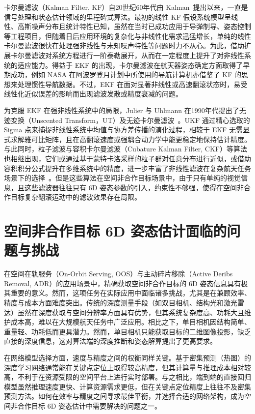 卡尔曼滤波（Kalman Filter, KF）自20世纪60年代由 Kalman~\cite{kalman1960new}提出以来，一直是信号处理和状态估计领域的里程碑式算法。最初的线性 KF 假设系统模型呈线性、高斯噪声分布且统计特性已知，虽然在当时已成功应用于导弹制导、姿态控制等工程项目，但随着日后应用环境的复杂化与非线性化需求迅猛增长，单纯的线性卡尔曼滤波很快在处理强非线性与未知噪声特性等问题时力不从心。为此，借助扩展卡尔曼滤波对系统方程进行一阶泰勒展开，从而在一定程度上提升了对非线性系统的适应能力。得益于 EKF 的出现，卡尔曼滤波在航天器姿态确定方面取得了早期成功，例如 NASA 在阿波罗登月计划中所使用的导航计算机亦借鉴了 KF 的思想来处理惯性导航数据。不过，EKF 在面对显著非线性或高速翻滚状态时，易受线性化近似误差的影响而出现滤波发散或精度衰减的问题。

为克服 EKF 在强非线性系统中的局限，Julier 与 Uhlmann 在1990年代提出了无迹变换（Unscented Transform，UT）及无迹卡尔曼滤波~\cite{Julier1997}。UKF 通过精心选取的 Sigma 点来捕捉非线性系统中均值与协方差传播的演化过程，相较于 EKF 无需显式求解雅可比矩阵，且在高翻滚速度或强耦合动力学中能更稳定地保持估计精度。与此同时，粒子滤波与容积卡尔曼滤波（Cubature Kalman Filter, CKF）等算法也相继出现，它们或通过基于蒙特卡洛采样的粒子群对任意分布进行近似，或借助容积积分公式提升在多维系统中的精度，进一步丰富了非线性滤波在复杂航天任务场景下的选择~\cite{9272767,AMCCKF_2023}。但是这些算法在空间非合作目标场景中，由于只有单纯的视觉信息，且这些滤波器往往只有 6D 姿态参数的引入，约束性不够强，使得在空间非合作目标复杂翻滚运动中的滤波效果存在局限。

\section{空间非合作目标 6D 姿态估计面临的问题与挑战}
\label{sec:problems_challenges}

在空间在轨服务（On-Orbit Serving, OOS）与主动碎片移除（Active Deribs Removal, ADR）的应用场景中，精确获取空间非合作目标的 6D 姿态信息具有极其重要的意义。然而，这项任务在实际应用中面临诸多挑战，尤其是在兼顾效率、精度与成本方面难度突出。传统的深度测量手段（如双目相机、结构光和激光雷达）虽然在深度获取与空间分辨率方面具有优势，但其系统复杂度高、功耗大且维护成本高，难以在大规模航天任务中广泛应用。相比之下，单目相机因结构简单、重量轻、功耗低而更具潜力。然而，单目相机只能获取目标的二维图像投影，缺乏直接的深度信息，这对算法端的深度推断和姿态解算提出了更高要求。

在网络模型选择方面，速度与精度之间的权衡同样关键。基于密集预测（热图）的深度学习网络通常能在关键点定位上取得较高精度，但其计算量与推理成本相对较高，不利于在资源受限的空间平台上进行实时部署。与之相比，端到端的直接回归模型虽然推理速度更快、计算资源需求更低，但在关键点定位精度上往往不及密集预测方法。如何在效率与精度之间寻求最佳平衡，并选择合适的网络架构，成为空间非合作目标 6D 姿态估计中需要解决的问题之一。

